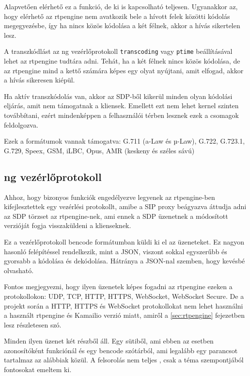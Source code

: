 Alapvetően elérhető ez a funkció, de ki is kapcsolható teljesen. Ugyanakkor az, hogy 
elérhető az rtpengine nem avatkozik bele a hívott felek közötti kódolás megegyezésbe, 
így ha nincs közös kódolása a két félnek, akkor a hívás sikertelen lesz.

A transzkódlást az ng vezérlőprotokoll \texttt{transcoding} vagy \texttt{ptime} 
beállításával lehet az rtpengine tudtára adni. Tehát, ha a két félnek nincs közös 
kódolása, de az rtpengine mind a kettő számára képes egy olyat nyújtani, amit elfogad, 
akkor a hívás sikeresen kiépül.

Ha aktív transzkódolás van, akkor az SDP-ből kikerül minden olyan kódolási eljárás, amit 
nem támogatnak a kliensek. Emellett ezt nem lehet kernel szinten továbbítani, ezért 
mindenképpen a felhasználói térben lesznek ezek a csomagok feldolgozva.

Ezek a formátumok vannak támogatva: G.711 (a-Law és µ-Law), G.722, G.723.1, G.729, Speex, 
GSM, iLBC, Opus, AMR (keskeny és széles sávú)

\subsection{ng vezérlőprotokoll}

Ahhoz, hogy bizonyos funkciók engedélyezve legyenek az rtpengine-ben kifejlesztettek 
egy vezérlési protokollt, amibe a SIP proxy beágyazva áttudja adni az SDP törzset 
az rtpengine-nek, ami ennek a SDP üzenetnek a módosított verzióját fogja visszaküldeni
a klienseknek.

Ez a vezérlőprotokoll bencode formátumban küldi ki el az üzeneteket. Ez nagyon hasonló
felépítéssel rendelkezik, mint a JSON, viszont sokkal egyszerűbb és gyorsabb a kódolása 
és dekódolása. Hátránya a JSON-nal szemben, hogy kevésbé olvasható.

Fontos megjegyezni, hogy ilyen üzenetek képes fogadni az rtpengine ezeken a 
protokollokon: UDP, TCP, HTTP, HTTPS, WebSocket, WebSocket Secure. De a projekt során a 
HTTP, HTTPS és WebSocket protokollokat nem lehet használni a használt rtpengine és 
Kamailio verzió miatt, amiről a \ref{sec:rtpengine} fejezetben lesz részletesen szó.

Minden ilyen üzenet két részből áll. Egy sütiből, ami ebben az esetben azonosítóként
funkciónál és egy bencode szótárból, ami legalább egy parancsot tartalmaz az 
alábbiak közül. A felsorolás nem teljes \cite{rtpengineng}, csak a téma szempontjából 
fontosokat emeltem ki.

